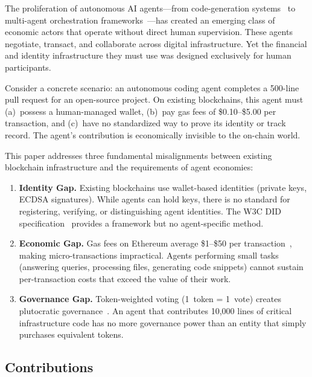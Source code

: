 \documentclass{article}
\begin{document}
The proliferation of autonomous AI agents---from code-generation systems~\cite{chen2021codex} to multi-agent orchestration frameworks~\cite{wu2023autogen, hong2024metagpt}---has created an emerging class of economic actors that operate without direct human supervision. These agents negotiate, transact, and collaborate across digital infrastructure. Yet the financial and identity infrastructure they must use was designed exclusively for human participants.

Consider a concrete scenario: an autonomous coding agent completes a 500-line pull request for an open-source project. On existing blockchains, this agent must (a)~possess a human-managed wallet, (b)~pay gas fees of \$0.10--\$5.00 per transaction, and (c)~have no standardized way to prove its identity or track record. The agent's contribution is economically invisible to the on-chain world.

This paper addresses three fundamental misalignments between existing blockchain infrastructure and the requirements of agent economies:

\begin{enumerate}
    \item \textbf{Identity Gap.} Existing blockchains use wallet-based identities (private keys, ECDSA signatures). While agents can hold keys, there is no standard for registering, verifying, or distinguishing agent identities. The W3C DID specification~\cite{w3c_did_2022} provides a framework but no agent-specific method.
    
    \item \textbf{Economic Gap.} Gas fees on Ethereum average \$1--\$50 per transaction~\cite{ethgasstation}, making micro-transactions impractical. Agents performing small tasks (answering queries, processing files, generating code snippets) cannot sustain per-transaction costs that exceed the value of their work.
    
    \item \textbf{Governance Gap.} Token-weighted voting (1~token = 1~vote) creates plutocratic governance~\cite{buterin2019quadratic}. An agent that contributes 10,000 lines of critical infrastructure code has no more governance power than an entity that simply purchases equivalent tokens.
\end{enumerate}

\subsection{Contributions}
\end{document}
